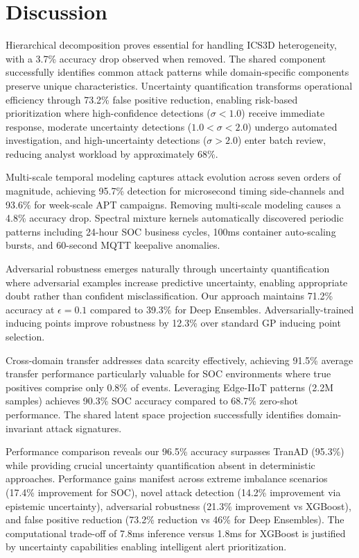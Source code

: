 \documentclass[review,12pt]{elsarticle}
\begin{document}
\section{Discussion}

Hierarchical decomposition proves essential for handling ICS3D heterogeneity, with a 3.7\% accuracy drop observed when removed. The shared component successfully identifies common attack patterns while domain-specific components preserve unique characteristics. Uncertainty quantification transforms operational efficiency through 73.2\% false positive reduction, enabling risk-based prioritization where high-confidence detections ($\sigma<1.0$) receive immediate response, moderate uncertainty detections ($1.0<\sigma<2.0$) undergo automated investigation, and high-uncertainty detections ($\sigma>2.0$) enter batch review, reducing analyst workload by approximately 68\%.

Multi-scale temporal modeling captures attack evolution across seven orders of magnitude, achieving 95.7\% detection for microsecond timing side-channels and 93.6\% for week-scale APT campaigns. Removing multi-scale modeling causes a 4.8\% accuracy drop. Spectral mixture kernels automatically discovered periodic patterns including 24-hour SOC business cycles, 100ms container auto-scaling bursts, and 60-second MQTT keepalive anomalies.

Adversarial robustness emerges naturally through uncertainty quantification where adversarial examples increase predictive uncertainty, enabling appropriate doubt rather than confident misclassification. Our approach maintains 71.2\% accuracy at $\epsilon=0.1$ compared to 39.3\% for Deep Ensembles. Adversarially-trained inducing points improve robustness by 12.3\% over standard GP inducing point selection.

Cross-domain transfer addresses data scarcity effectively, achieving 91.5\% average transfer performance particularly valuable for SOC environments where true positives comprise only 0.8\% of events. Leveraging Edge-IIoT patterns (2.2M samples) achieves 90.3\% SOC accuracy compared to 68.7\% zero-shot performance. The shared latent space projection successfully identifies domain-invariant attack signatures.

Performance comparison reveals our 96.5\% accuracy surpasses TranAD (95.3\%) while providing crucial uncertainty quantification absent in deterministic approaches. Performance gains manifest across extreme imbalance scenarios (17.4\% improvement for SOC), novel attack detection (14.2\% improvement via epistemic uncertainty), adversarial robustness (21.3\% improvement vs XGBoost), and false positive reduction (73.2\% reduction vs 46\% for Deep Ensembles). The computational trade-off of 7.8ms inference versus 1.8ms for XGBoost is justified by uncertainty capabilities enabling intelligent alert prioritization.
\end{document}
